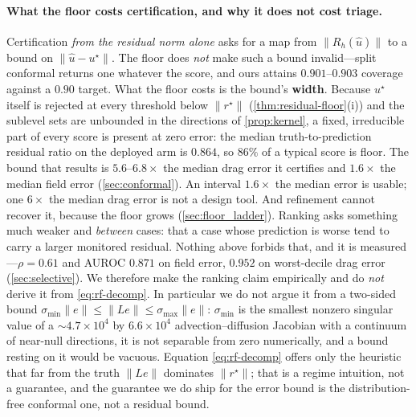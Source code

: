 \paragraph{What the floor costs certification, and why it does not cost triage.}
Certification \emph{from the residual norm alone} asks for a map from $\|R_h(\hat u)\|$ to
a bound on $\|\hat u-u^\star\|$.
The floor does \emph{not} make such a bound invalid---split conformal returns one
whatever the score, and ours attains $0.901$--$0.903$ coverage against a $0.90$ target.
What the floor costs is the bound's \textbf{width}. Because $u^\star$ itself is rejected
at every threshold below $\|r^\star\|$ (\autoref{thm:residual-floor}(i)) and the sublevel
sets are unbounded in the directions of \autoref{prop:kernel}, a fixed, irreducible part
of every score is present at zero error: the median truth-to-prediction residual ratio on
the deployed arm is $0.864$, so $86\%$ of a typical score is floor. The bound that results
is $5.6$--$6.8\times$ the median drag error it certifies and $1.6\times$ the median field
error (\autoref{sec:conformal}). An interval $1.6\times$ the median error is usable; one
$6\times$ the median drag error is not a design tool. And refinement cannot recover it,
because the floor grows (\autoref{sec:floor_ladder}). Ranking asks something much
weaker and \emph{between} cases: that a case whose prediction is worse tend to carry a
larger monitored residual. Nothing above forbids that, and it is measured---$\rho=0.61$
and AUROC $0.871$ on field error, $0.952$ on worst-decile drag error
(\autoref{sec:selective}). We therefore make the ranking claim empirically and do
\emph{not} derive it from \eqref{eq:rf-decomp}. In particular we do not argue it from a
two-sided bound $\sigma_{\min}\|e\|\le\|Le\|\le\sigma_{\max}\|e\|$: $\sigma_{\min}$ is the
smallest nonzero singular value of a $\sim\!4.7\times10^4$ by $6.6\times10^4$
advection--diffusion Jacobian with a continuum of near-null directions, it is not
separable from zero numerically, and a bound resting on it would be vacuous. Equation
\eqref{eq:rf-decomp} offers only the heuristic that far from the truth $\|Le\|$ dominates
$\|r^\star\|$; that is a regime intuition, not a guarantee, and the guarantee we do ship
for the error bound is the distribution-free conformal one, not a residual bound.

